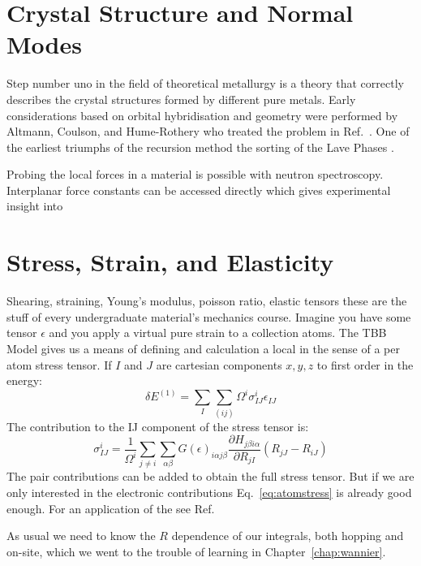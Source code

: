 \section{Crystal Structure and Normal Modes}
Step number uno in the field of theoretical metallurgy is a theory that correctly
describes the crystal structures formed by different pure metals. 
Early considerations based on orbital hybridisation and geometry
were performed by Altmann, Coulson, and Hume-Rothery who treated 
the problem in Ref.~\cite{altmann57}. One of the earliest triumphs 
of the recursion method the sorting of the Lave 
Phases \cite{haydocklaves75,johannes76}.

Probing the local forces in a material is possible with neutron spectroscopy.
Interplanar force constants can be accessed directly which gives experimental
insight into \cite{varma79a, varma79b}

\section{Stress, Strain, and Elasticity}
Shearing, straining, Young's modulus, poisson ratio, elastic tensors these are the
stuff of every undergraduate material's mechanics course.
Imagine you have some tensor $\epsilon$ and you apply a virtual pure strain to a collection atoms.
The TBB Model \cite{nielsen83, sutton88} gives us a means of defining and calculation 
a local in the sense of a per atom stress tensor. If $I$ and $J$ 
are cartesian components $x,y,z$ to first order in the energy:
%
\begin{equation}
\delta E^(1) = \sum_{I} \sum_{(ij)}\Omega^{i}\sigma^{i}_{IJ}\epsilon_{IJ}
\end{equation}
%
The contribution to the IJ component of the stress tensor is:
%
\begin{equation}
\label{eq:atomstress}
\sigma^{i}_{IJ} = \frac{1}{\Omega^{i}}\sum_{j\neq i}\sum_{\alpha\beta}G(\epsilon)_{i\alpha j\beta}\frac{\partial H_{j\beta i\alpha}}{\partial R_{jI}}(R_{jJ}-R_{iJ})
\end{equation}
%
The pair contributions can be added to obtain the full stress tensor. 
But if we are only interested in the electronic contributions
Eq.~\ref{eq:atomstress} is already good enough. For an application of the 
see Ref.~\cite{ohta90}

As usual we need to know the $R$ dependence of our
integrals, both hopping and on-site, which we went to the trouble 
of learning in Chapter~\ref{chap:wannier}.

